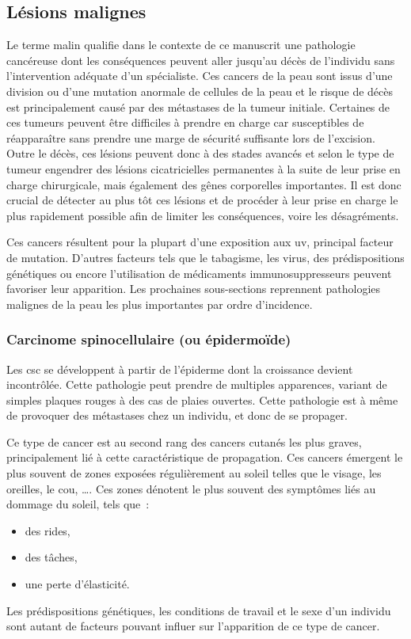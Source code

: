 \subsection{Lésions malignes}
Le terme malin qualifie dans le contexte de ce manuscrit une pathologie cancéreuse dont les conséquences peuvent aller jusqu'au décès de l'individu sans l'intervention adéquate d'un spécialiste. Ces cancers de la peau sont issus d’une division ou d’une mutation anormale de cellules de la peau et le risque de décès est principalement causé par des métastases de la tumeur initiale. Certaines de ces tumeurs peuvent être difficiles à prendre en charge car susceptibles de réapparaître sans prendre une marge de sécurité suffisante lors de l'excision. Outre le décès, ces lésions peuvent donc à des stades avancés et selon le type de tumeur engendrer des lésions cicatricielles permanentes à la suite de leur prise en charge chirurgicale, mais également des gênes corporelles importantes. Il est donc crucial de détecter au plus tôt ces lésions et de procéder à leur prise en charge le plus rapidement possible afin de limiter les conséquences, voire les désagréments.\par

Ces cancers résultent pour la plupart d’une exposition aux \gls{uv}, principal facteur de mutation. D’autres facteurs tels que le tabagisme, les virus, des prédispositions génétiques ou encore l’utilisation de médicaments immunosuppresseurs peuvent favoriser leur apparition. Les prochaines sous-sections reprennent pathologies malignes de la peau les plus importantes par ordre d'incidence.\par

\subsubsection{Carcinome spinocellulaire (ou épidermoïde)}
Les \gls{csc} se développent à partir de l'épiderme dont la croissance devient incontrôlée. Cette pathologie peut prendre de multiples apparences, variant de simples plaques rouges à des cas de plaies ouvertes. Cette pathologie est à même de provoquer des métastases chez un individu, et donc de se propager.\par

Ce type de cancer est au second rang des cancers cutanés les plus graves, principalement lié à cette caractéristique de propagation. Ces cancers émergent le plus souvent de zones exposées régulièrement au soleil telles que le visage, les oreilles, le cou, \ldots. Ces zones dénotent le plus souvent des symptômes liés au dommage du soleil, tels que~:
\begin{itemize}
    \item des rides,
    \item des tâches,
    \item une perte d’élasticité.
\end{itemize}
Les prédispositions génétiques, les conditions de travail et le sexe d’un individu sont autant de facteurs pouvant influer sur l’apparition de ce type de cancer.\par


